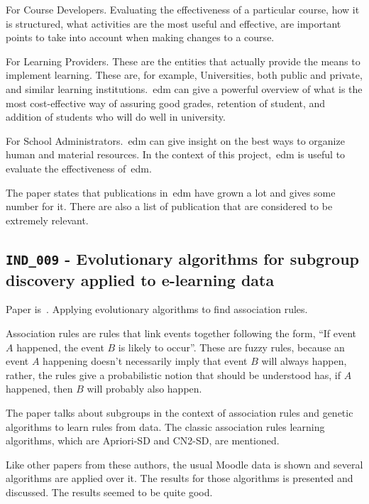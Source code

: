 For Course Developers. Evaluating the effectiveness of a particular course, how
it is structured, what activities are the most useful and effective, are
important points to take into account when making changes to a course.

For Learning Providers. These are the entities that actually provide the means
to implement learning. These are, for example, Universities, both public and
private, and similar learning institutions.~\gls{edm} can give a powerful
overview of what is the most cost-effective way of assuring good grades,
retention of student, and addition of students who will do well in university.

For School Administrators.~\gls{edm} can give insight on the best ways to
organize human and material resources. In the context of this
project,~\gls{edm} is useful to evaluate the effectiveness of~\gls{edm}.

The paper states that publications in~\gls{edm} have grown a lot and gives some
number for it. There are also a list of publication that are considered to be
extremely relevant.

\subsection{\texttt{IND\_009} - Evolutionary algorithms for subgroup discovery
applied to e-learning data}

Paper is~\cite{ind_009}. Applying evolutionary algorithms to find association
rules.

Association rules are rules that link events together following the form, ``If
event $ A $ happened, the event $ B $ is likely to occur''. These are fuzzy
rules, because an event $ A $ happening doesn't necessarily imply that event $
B $ will always happen, rather, the rules give a probabilistic notion that
should be understood has, if $ A $ happened, then $ B $ will probably also
happen.

The paper talks about subgroups in the context of association rules and genetic
algorithms to learn rules from data. The classic association rules learning
algorithms, which are Apriori-SD and CN2-SD, are mentioned.

Like other papers from these authors, the usual Moodle data is shown and
several algorithms are applied over it. The results for those algorithms is
presented and discussed. The results seemed to be quite good.
